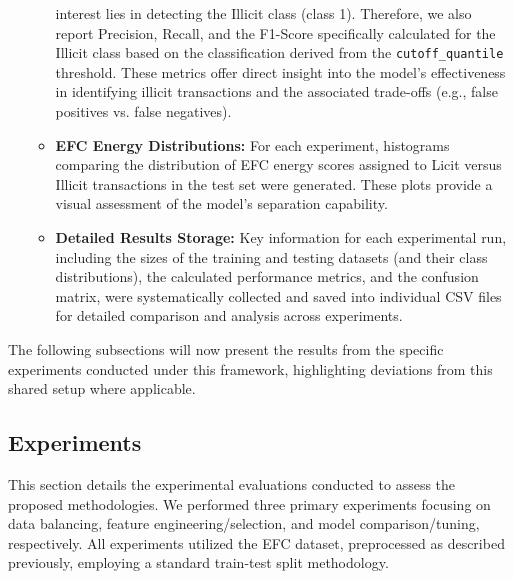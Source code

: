 \documentclass[12pt]{article}
\begin{document}
\begin{itemize}
\begin{itemize}
                interest lies in detecting the Illicit class (class 1). Therefore, we also report Precision, Recall, and
                the F1-Score specifically calculated for the Illicit class based on the classification derived from the
                \texttt{cutoff\_quantile} threshold. These metrics offer direct insight into the model's effectiveness in
                identifying illicit transactions and the associated trade-offs (e.g., false positives vs. false negatives).
              \item \textbf{EFC Energy Distributions:} For each experiment, histograms comparing the distribution of EFC
                energy scores assigned to Licit versus Illicit transactions in the test set were generated. These plots
                  provide a visual assessment of the model's separation capability.
              \item \textbf{Detailed Results Storage:} Key information for each experimental run, including the sizes of
                the training and testing datasets (and their class distributions), the calculated performance metrics,
                and the confusion matrix, were systematically collected and saved into individual CSV files for detailed
                comparison and analysis across experiments.
          \end{itemize}
\end{itemize}

The following subsections will now present the results from the specific experiments conducted under this framework, highlighting
deviations from this shared setup where applicable.

\subsection{Experiments} \label{subsec:experiments}

This section details the experimental evaluations conducted to assess the proposed methodologies. We performed three primary
experiments focusing on data balancing, feature engineering/selection, and model comparison/tuning, respectively. All
experiments utilized the EFC dataset, preprocessed as described previously, employing a standard train-test split methodology.
\end{document}
